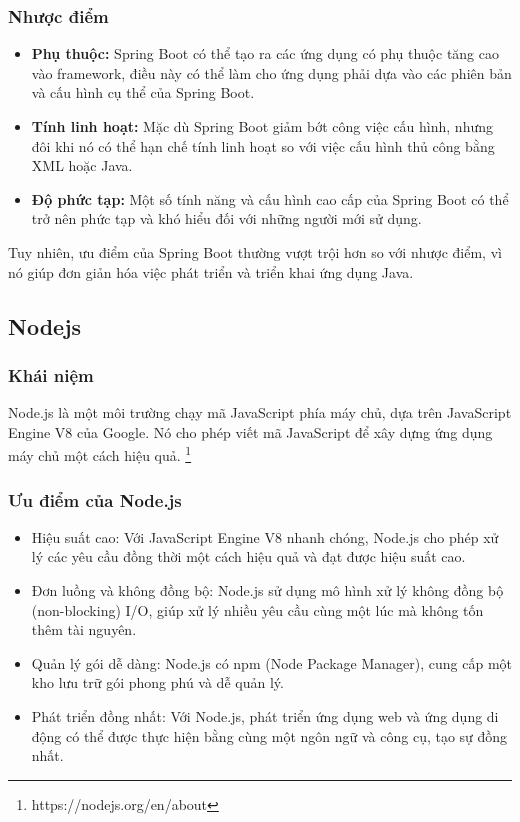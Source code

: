 \subsubsection{Nhược điểm}
\begin{itemize}
    \item \textbf{Phụ thuộc:} Spring Boot có thể tạo ra các ứng dụng có phụ thuộc tăng cao vào framework, điều này có thể làm cho ứng dụng phải dựa vào các phiên bản và cấu hình cụ thể của Spring Boot.
    \item \textbf{Tính linh hoạt:} Mặc dù Spring Boot giảm bớt công việc cấu hình, nhưng đôi khi nó có thể hạn chế tính linh hoạt so với việc cấu hình thủ công bằng XML hoặc Java.
    \item \textbf{Độ phức tạp:} Một số tính năng và cấu hình cao cấp của Spring Boot có thể trở nên phức tạp và khó hiểu đối với những người mới sử dụng.
\end{itemize}
\indent Tuy nhiên, ưu điểm của Spring Boot thường vượt trội hơn so với nhược điểm, vì nó giúp đơn giản hóa việc phát triển và triển khai ứng dụng Java.

\subsection{Nodejs}
\subsubsection{Khái niệm}
\indent Node.js là một môi trường chạy mã JavaScript phía máy chủ, dựa trên JavaScript Engine V8 của Google. Nó cho phép viết mã JavaScript để xây dựng ứng dụng máy chủ một cách hiệu quả. \footnote{https://nodejs.org/en/about}
\subsubsection{Ưu điểm của Node.js}
\begin{itemize}
    \item Hiệu suất cao: Với JavaScript Engine V8 nhanh chóng, Node.js cho phép xử lý các yêu cầu đồng thời một cách hiệu quả và đạt được hiệu suất cao.
    \item Đơn luồng và không đồng bộ: Node.js sử dụng mô hình xử lý không đồng bộ (non-blocking) I/O, giúp xử lý nhiều yêu cầu cùng một lúc mà không tốn thêm tài nguyên.
    \item Quản lý gói dễ dàng: Node.js có npm (Node Package Manager), cung cấp một kho lưu trữ gói phong phú và dễ quản lý.
    \item Phát triển đồng nhất: Với Node.js, phát triển ứng dụng web và ứng dụng di động có thể được thực hiện bằng cùng một ngôn ngữ và công cụ, tạo sự đồng nhất.
\end{itemize}
